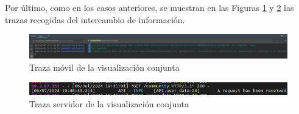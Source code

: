             Por último, como en los casos anteriores, se muestran en las Figuras \ref{figure:pruebas:comunidad:movil} y \ref{figure:pruebas:comunidad:servidor} las trazas recogidas del intercambio de información.
            
            \begin{figure}[h]
                \centering
                \includegraphics[width=1\textwidth]{figures/pruebas/comunidad/Traza movil.png}
                \caption{Traza móvil de la visualización conjunta}
                \label{figure:pruebas:comunidad:movil}
            \end{figure}

            \begin{figure}[h]
                \centering
                \includegraphics[width=1\textwidth]{figures/pruebas/comunidad/Traza servidor.png}
                \caption{Traza servidor de la visualización conjunta}
                \label{figure:pruebas:comunidad:servidor}
            \end{figure}